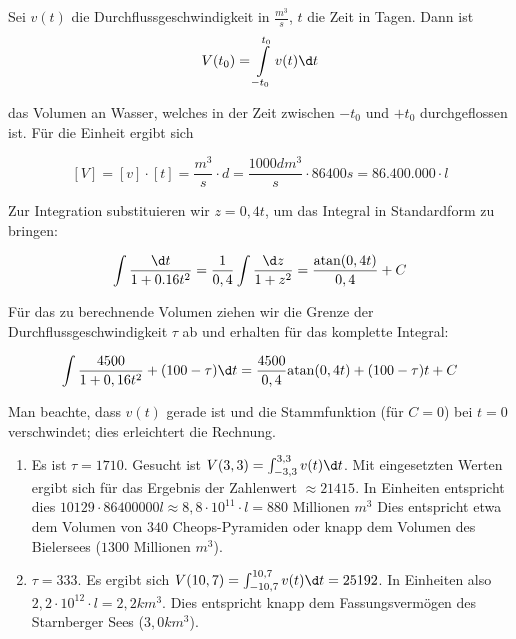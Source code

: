 Sei $v(t)$ die Durchflussgeschwindigkeit in $\frac{m^3}{s}$, $t$ die Zeit in Tagen. Dann ist
$$V(t_0) = \int\limits_{-t_0}^{t_0}v(t)\d t$$

das Volumen an Wasser, welches in der Zeit zwischen $-t_0$ und $+t_0$ durchgeflossen ist. Für die Einheit ergibt sich

$$[V] = [v]\cdot[t] = \frac{m^3}{s}\cdot d = \frac{1000 dm^3}{s}\cdot 86400s = 86.400.000\cdot l$$

Zur Integration substituieren wir $z=0,4t$, um das Integral in Standardform zu bringen:

$$\int \frac{\d t}{1+0.16t^2} = \frac{1}{0,4}\int\frac{\d z}{1+z^2} = \frac{\text{atan}(0,4t)}{0,4} + C$$

Für das zu berechnende Volumen ziehen wir die Grenze der Durchflussgeschwindigkeit $\tau$ ab und erhalten für das komplette Integral:

$$\int\frac{4500}{1+0,16t^2}+ (100-\tau) \d t = \frac{4500}{0,4} \text{atan}(0,4t) + (100-\tau)t + C$$

Man beachte, dass $v(t)$ gerade ist und die Stammfunktion (für $C=0$) bei $t=0$ verschwindet; dies erleichtert die Rechnung.

\begin{enumerate}[label=(\roman*)]

\item Es ist $\tau=1710$. Gesucht ist $V(3,3) = \int_{-3,3}^{3,3} v(t) \d t$. Mit eingesetzten Werten ergibt sich für das Ergebnis der Zahlenwert  $\approx 21415$. In Einheiten entspricht dies $10129\cdot 86400000l \approx 8,8 \cdot 10^{11} \cdot l = 880 \text{ Millionen } m^3$ Dies entspricht etwa dem Volumen von $340$ Cheops-Pyramiden oder knapp dem Volumen des Bielersees ($1300 \text{ Millionen } m^3$).

\item $\tau=333$. Es ergibt sich $V(10,7) = \int_{-10,7}^{10,7} v(t) \d t = 25192$. In Einheiten also $2,2\cdot10^{12}\cdot l = 2,2 km^3$. Dies entspricht knapp dem Fassungsvermögen des Starnberger Sees ($3,0 km^3$).

\end{enumerate}

